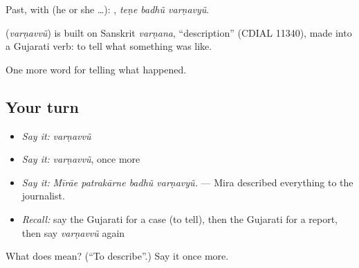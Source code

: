 Past, with  (he or she …):   , \emph{teṇe badhũ varṇavyũ}.

\begin{cousinweb}
\textbf{} (\emph{varṇavvũ}) is built on Sanskrit \emph{varṇana}, \textquotedblleft{}description\textquotedblright{} (CDIAL 11340), made into a Gujarati verb: to tell what something was like.
\end{cousinweb}

\begin{grammarlens}[title={What you've built}]
One more word for telling what happened.
\end{grammarlens}

\subsection*{Your turn}
\begin{itemize}
\raggedright
  \item \emph{Say it:} \emph{varṇavvũ}
  \item \emph{Say it:} \emph{varṇavvũ}, once more
  \item \emph{Say it:} \emph{Mīrāe patrakārne badhũ varṇavyũ.} — Mira described everything to the journalist.
  \item \emph{Recall:} say the Gujarati for a case (to tell), then the Gujarati for a report, then say \emph{varṇavvũ} again
\end{itemize}

\begin{tcolorbox}[breakable,colback=teal!4,colframe=teal!35!black,title={Before you move on}]
What does  mean? (\textquotedblleft{}To describe\textquotedblright{}.) Say it once more.
\end{tcolorbox}
